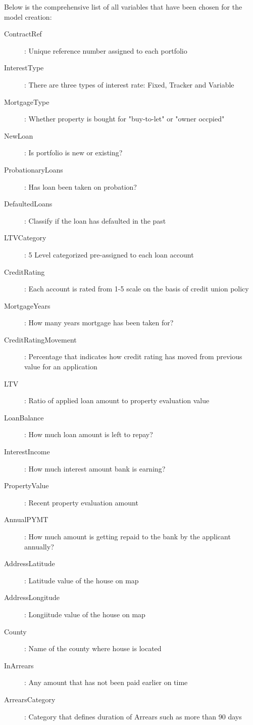 Below is the comprehensive list of all variables that have been chosen for the model creation:
\begin{description}
  \item[ContractRef]: Unique reference number assigned to each portfolio
  \item[InterestType]: There are three types of interest rate: Fixed, Tracker and Variable
  \item[MortgageType]: Whether property is bought for "buy-to-let" or "owner occpied"
  \item[NewLoan]: Is portfolio is new or existing?
  \item[ProbationaryLoans]: Has loan been taken on probation?
  \item[DefaultedLoans]: Classify if the loan has defaulted in the past
  \item[LTVCategory]: 5 Level categorized pre-assigned to each loan account
  \item[CreditRating]: Each account is rated from 1-5 scale on the basis of credit union policy
  \item[MortgageYears]: How many years mortgage has been taken for?
  \item[CreditRatingMovement]: Percentage that indicates how credit rating has moved from previous value for an application
  \item[LTV]: Ratio of applied loan amount to property evaluation value 
  \item[LoanBalance]: How much loan amount is left to repay?
  \item[InterestIncome]: How much interest amount bank is earning?
  \item[PropertyValue]: Recent property evaluation amount
  \item[AnnualPYMT]: How much amount is getting repaid to the bank by the applicant annually?
  \item[AddressLatitude]: Latitude value of the house on map
  \item[AddressLongitude]: Longiitude value of the house on map
  \item[County]: Name of the county where house is located
  \item[InArrears]: Any amount that has not been paid earlier on time
  \item[ArrearsCategory]: Category that defines duration of Arrears such as more than 90 days
\end{description}

